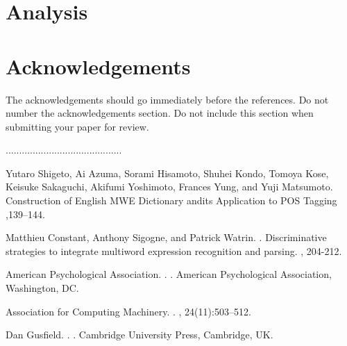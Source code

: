 \documentclass[11pt]{article}
\begin{document}
\section{Analysis}

\section*{Acknowledgements}

The acknowledgements should go immediately before the references.  Do
not number the acknowledgements section. Do not include this section
when submitting your paper for review.

%
%

\begin{thebibliography}{}

...........................................

Yutaro Shigeto, Ai Azuma, Sorami Hisamoto, Shuhei Kondo, Tomoya Kose,
Keisuke Sakaguchi, Akifumi Yoshimoto, Frances Yung, and Yuji Matsumoto.
\newblock Construction of English MWE Dictionary andits Application to POS Tagging
,139--144.

Matthieu Constant, Anthony Sigogne, and Patrick Watrin.
.
\newblock Discriminative strategies to integrate multiword expression recognition and parsing.
,
204-212.

{American Psychological Association}.
.
.
\newblock American Psychological Association, Washington, DC.

{Association for Computing Machinery}.
.
, 24(11):503--512.

Dan Gusfield.
.
.
\newblock Cambridge University Press, Cambridge, UK.

\end{thebibliography}
\end{document}
